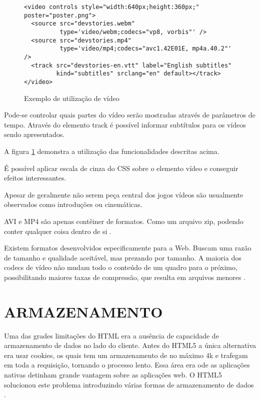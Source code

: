 \begin{figure}
\centering
\begin{verbatim}
<video controls style="width:640px;height:360px;" poster="poster.png">
  <source src="devstories.webm" 
          type='video/webm;codecs="vp8, vorbis"' />
  <source src="devstories.mp4" 
          type='video/mp4;codecs="avc1.42E01E, mp4a.40.2"' />
  <track src="devstories-en.vtt" label="English subtitles" 
         kind="subtitles" srclang="en" default></track>
</video>
\end{verbatim}
\caption{Exemplo de utilização de vídeo}
\label{fig:video}
\end{figure}
\begin{draft}

Pode-se controlar quais partes do vídeo serão mostradas através de parâmetros de tempo.
Através do elemento track é possível informar subtítulos para os vídeos sendo apresentados.

A figura \ref{fig:video} demonstra a utilização das funcionalidades descritas acima.

É possível aplicar escala de cinza do CSS sobre o elemento vídeo e conseguir efeitos interessantes.

Apesar de geralmente não serem peça central dos jogos vídeos são
usualmente observados como introduções ou cinemáticas.

AVI e MP4 são apenas contêiner de formatos. Como um arquivo zip,
podendo conter qualquer coisa dentro de si \autocite{diveIntohtml}.

Existem formatos desenvolvidos especificamente para a Web. Buscam uma
razão de tamanho e qualidade aceitável, mas prezando por tamanho. A
maioria dos codecs de vídeo não mudam todo o conteúdo de um quadro
para o próximo, possibilitando maiores taxas de compressão, que
resulta em arquivos menores \autocite{diveIntohtml}.

\end{draft}
\section{ARMAZENAMENTO}
Uma das grades limitações do HTML era a ausência de capacidade de
armazenamento de dados no lado do cliente. Antes do HTML5 a única
alternativa era usar cookies, os quais tem um armazenamento de no
máximo 4k e trafegam em toda a requisição, tornando o processo lento.
Essa área era ode as aplicações nativas detinham grande vantagem
sobre as aplicações web. O HTML5 solucionou este problema introduzindo
várias formas de armazenamento de dados \autocite{html5Tradeoffs}.

